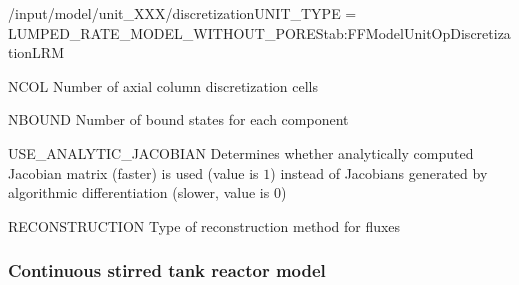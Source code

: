 \begin{condsubgroup}{/input/model/unit\_XXX/discretization}{UNIT\_TYPE = LUMPED\_RATE\_MODEL\_WITHOUT\_PORES}{tab:FFModelUnitOpDiscretizationLRM}
  \begin{dataset}[type=int,range={$\geq 1$},length=1]{NCOL}
    Number of axial column discretization cells
  \end{dataset}
  \begin{dataset}[type=int,range={$\geq 0$},length={\texttt{NCOMP}}]{NBOUND}
    Number of bound states for each component
  \end{dataset}
  \begin{dataset}[type=int,range={$\{0, 1\}$},length=1]{USE\_ANALYTIC\_JACOBIAN}
    Determines whether analytically computed Jacobian matrix (faster) is used (value is $1$) instead of Jacobians generated by algorithmic differentiation (slower, value is $0$)
  \end{dataset}
  \begin{dataset}[type=string,range={\texttt{WENO}},length={1}]{RECONSTRUCTION}
    Type of reconstruction method for fluxes
  \end{dataset}
\end{condsubgroup}

\subsubsection{Continuous stirred tank reactor model}

